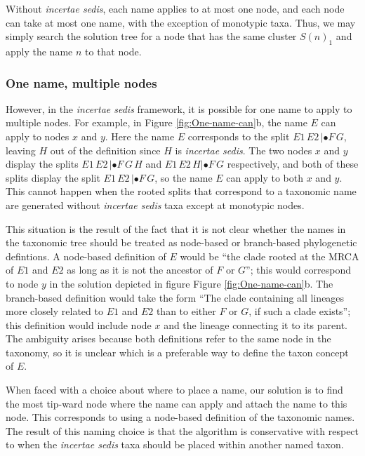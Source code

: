 \documentclass[english]{article}
\begin{document}
Without \emph{incertae sedis}, each name applies to at most one node, and each
node can take at most one name, with the exception of monotypic taxa. Thus, we
may simply search the solution tree for a node that has the same cluster $S(n)_{1}$
and apply the name $n$ to that node.

\subsubsection{One name, multiple nodes}
However, in the \emph{incertae sedis} framework, it is possible for one name to
apply to multiple nodes. For example, in Figure \ref{fig:One-name-can}b, the
name $E$ can apply to nodes $x$ and $y$. Here the name $E$ corresponds to the split
$E1\,E2\,|\bullet F\,G$, leaving $H$ out of the definition since $H$ is \emph{incertae sedis}. 
The two nodes $x$
and $y$ display the splits $E1\,E2\,|\bullet F\,G\,H$ and $E1\,E2\,H|\bullet
F\,G$ respectively, and both
of these splits display the split $E1\,E2\,|\bullet F\,G$, so the name $E$ can apply to both
$x$ and $y$. 
This cannot happen when the rooted splits that correspond to a taxonomic name
    are generated without\emph{ incertae sedis} taxa except at
monotypic nodes.

This situation is the result of the fact that it is not clear whether the names
    in the taxonomic tree should be treated as node-based or branch-based
    phylogenetic defintions.
A node-based definition of $E$ would be ``the clade rooted at the MRCA of $E1$ and $E2$ as long as it is not
    the ancestor of $F$ or $G$''; this would correspond to node $y$ in the solution
    depicted in figure Figure \ref{fig:One-name-can}b.
The branch-based definition would take the form ``The clade containing all lineages more closely related to 
   $E1$ and $E2$ than to either $F$ or $G$, if such a clade exists''; this definition
   would include node $x$ and the lineage connecting it to its parent.
The ambiguity arises because both definitions refer to the same node in the taxonomy,
    so it is unclear which is a preferable way to define the taxon concept of $E$.

When faced with a choice about where to place a name, our
solution is to find the most tip-ward node where the name can apply and attach
the name to this node.
This corresponds to using a node-based definition of the taxonomic names.
The result of this naming choice is that the algorithm is conservative with respect
    to when the \emph{incertae sedis} taxa should be placed within another named
    taxon.
\end{document}
